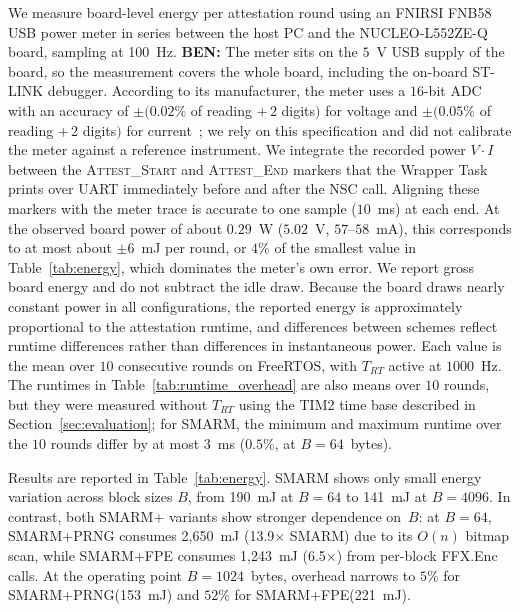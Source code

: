 \documentclass{ieeeaccess}
\DeclareRobustCommand{\ben}[1]{{\color{BENcolor}\textbf{BEN:} #1}}
\newcommand{\rtsmarm}{SMARM+\xspace}
\newcommand{\rtsmarmone}{SMARM+PRNG\xspace}
\newcommand{\rtsmarmtwo}{SMARM+FPE\xspace}
\begin{document}
We measure board-level energy per attestation round using 
an FNIRSI FNB58 USB power meter in series between the host 
PC and the NUCLEO-L552ZE-Q board, sampling at 100~Hz. 
\ben{The meter sits on the $5$~V USB supply of the board, so the measurement covers the whole board, including the on-board ST-LINK debugger.
According to its manufacturer, the meter uses a $16$-bit ADC with an accuracy of $\pm(0.02\%$ of reading $+\,2$ digits$)$ for voltage and $\pm(0.05\%$ of reading $+\,2$ digits$)$ for current~\cite{fnb58}; we rely on this specification and did not calibrate the meter against a reference instrument.
We integrate the recorded power $V \cdot I$ between the \textsc{Attest\_Start} and \textsc{Attest\_End} markers that the Wrapper Task prints over UART immediately before and after the NSC call.
Aligning these markers with the meter trace is accurate to one sample ($10$~ms) at each end.
At the observed board power of about $0.29$~W ($5.02$~V, $57$--$58$~mA), this corresponds to at most about $\pm 6$~mJ per round, or $4\%$ of the smallest value in Table~\ref{tab:energy}, which dominates the meter's own error.
We report gross board energy and do not subtract the idle draw.
Because the board draws nearly constant power in all configurations, the reported energy is approximately proportional to the attestation runtime, and differences between schemes reflect runtime differences rather than differences in instantaneous power.
Each value is the mean over $10$ consecutive rounds on FreeRTOS, with $T_{RT}$ active at $1000$~Hz.
The runtimes in Table~\ref{tab:runtime_overhead} are also means over $10$ rounds, but they were measured without $T_{RT}$ using the TIM2 time base described in Section~\ref{sec:evaluation}; for SMARM, the minimum and maximum runtime over the $10$ rounds differ by at most $3$~ms ($0.5\%$, at $B = 64$~bytes).}

%
Results are reported in Table~\ref{tab:energy}.
SMARM shows only small energy variation across block sizes $B$, from 190~mJ at $B=64$ to 141~mJ at $B=4096$.
In contrast, both \rtsmarm variants show stronger dependence on~$B$: 
at $B = 64$, \rtsmarmone consumes 2{,}650~mJ 
(13.9$\times$ SMARM) due to its $O(n)$ bitmap scan, 
while \rtsmarmtwo consumes 1{,}243~mJ (6.5$\times$) 
from per-block \textsf{FFX.Enc} calls.
At the operating point $B = 1024$~bytes, overhead 
narrows to $5\%$ for \rtsmarmone (153~mJ) and 
$52\%$ for \rtsmarmtwo (221~mJ).
\end{document}
